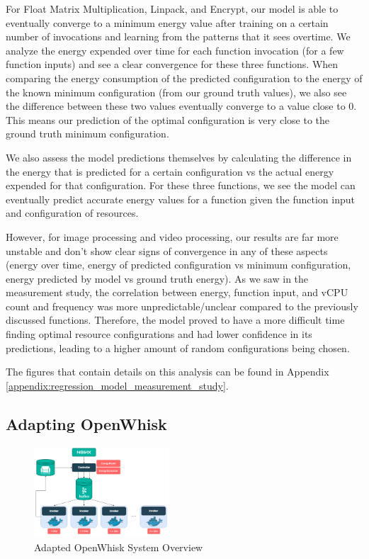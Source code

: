 \documentclass[times, 10pt,twocolumn]{article}
\begin{document}
For Float Matrix Multiplication, Linpack, and Encrypt, our model is able to eventually converge to a minimum energy value after training on a certain number of invocations and learning from the patterns that it sees overtime. We analyze the energy expended over time for each function invocation (for a few function inputs) and see a clear convergence for these three functions. When comparing the energy consumption of the predicted configuration to the energy of the known minimum configuration (from our ground truth values), we also see the difference between these two values eventually converge to a value close to 0. This means our prediction of the optimal configuration is very close to the ground truth minimum configuration. 

We also assess the model predictions themselves by calculating the difference in the energy that is predicted for a certain configuration vs the actual energy expended for that configuration. For these three functions, we see the model can eventually predict accurate energy values for a function given the function input and configuration of resources.

However, for image processing and video processing, our results are far more unstable and don't show clear signs of convergence in any of these aspects (energy over time, energy of predicted configuration vs minimum configuration, energy predicted by model vs ground truth energy). As we saw in the measurement study, the correlation between energy, function input, and vCPU count and frequency was more unpredictable/unclear compared to the previously discussed functions. Therefore, the model proved to have a more difficult time finding optimal resource configurations and had lower confidence in its predictions, leading to a higher amount of random configurations being chosen. 

The figures that contain details on this analysis can be found in Appendix \ref{appendix:regression_model_measurement_study}.


\subsection{Adapting OpenWhisk}

\begin{figure}[ht]
   \centering
   \includegraphics[width=0.45\textwidth]{imgs/Adapted_OW_System_Overview.png}
   \caption{Adapted OpenWhisk System Overview}
   \label{fig:adapted_ow_system_overview}
 \end{figure}
\end{document}

